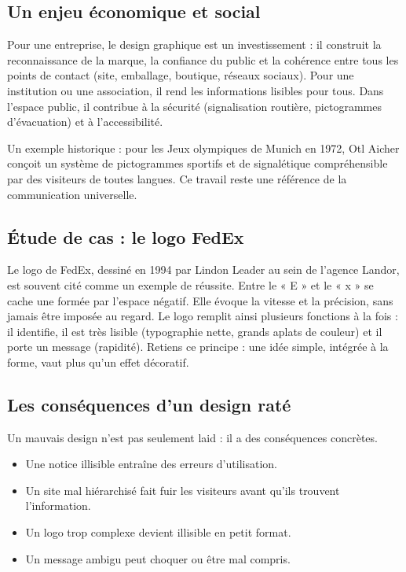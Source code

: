 \subsection{Un enjeu économique et social}

Pour une entreprise, le design graphique est un investissement : il construit la reconnaissance de la marque, la confiance du public et la cohérence entre tous les points de contact (site, emballage, boutique, réseaux sociaux). Pour une institution ou une association, il rend les informations lisibles pour tous. Dans l'espace public, il contribue à la sécurité (signalisation routière, pictogrammes d'évacuation) et à l'accessibilité.

Un exemple historique : pour les Jeux olympiques de Munich en 1972, Otl Aicher conçoit un système de pictogrammes sportifs et de signalétique compréhensible par des visiteurs de toutes langues. Ce travail reste une référence de la communication universelle.

\subsection{Étude de cas : le logo FedEx}

\begin{defbox}
Le logo de FedEx, dessiné en 1994 par Lindon Leader au sein de l'agence Landor, est souvent cité comme un exemple de réussite. Entre le « E » et le « x » se cache une  formée par l'espace négatif. Elle évoque la vitesse et la précision, sans jamais être imposée au regard. Le logo remplit ainsi plusieurs fonctions à la fois : il identifie, il est très lisible (typographie nette, grands aplats de couleur) et il porte un message (rapidité). Retiens ce principe : une idée simple, intégrée à la forme, vaut plus qu'un effet décoratif.
\end{defbox}

\subsection{Les conséquences d'un design raté}

Un mauvais design n'est pas seulement laid : il a des conséquences concrètes.

\begin{itemize}
    \item Une notice illisible entraîne des erreurs d'utilisation.
    \item Un site mal hiérarchisé fait fuir les visiteurs avant qu'ils trouvent l'information.
    \item Un logo trop complexe devient illisible en petit format.
    \item Un message ambigu peut choquer ou être mal compris.
\end{itemize}

